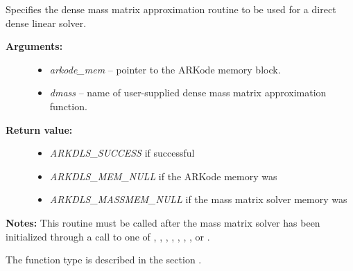 \documentclass[letterpaper,10pt,english]{sphinxmanual}
\begin{document}
\begin{fulllineitems}
\label{c_interface/User_callable:c.ARKDlsSetDenseMassFn}
Specifies the dense mass matrix approximation routine to
be used for a direct dense linear solver.
\begin{description}
\item[{\textbf{Arguments:}}] \leavevmode\begin{itemize}
\item {} 
\emph{arkode\_mem} -- pointer to the ARKode memory block.

\item {} 
\emph{dmass} -- name of user-supplied dense mass matrix approximation function.

\end{itemize}

\item[{\textbf{Return value:}}] \leavevmode\begin{itemize}
\item {} 
\emph{ARKDLS\_SUCCESS}  if successful

\item {} 
\emph{ARKDLS\_MEM\_NULL}  if the ARKode memory was 

\item {} 
\emph{ARKDLS\_MASSMEM\_NULL} if the mass matrix solver memory was 

\end{itemize}

\end{description}

\textbf{Notes:} This routine must be called after the mass matrix solver
has been initialized through a call to one of
{\hyperref[c_interface/User_callable:c.ARKMassDense]{\emph{}}}, {\hyperref[c_interface/User_callable:c.ARKMassLapackDense]{\emph{}}},
{\hyperref[c_interface/User_callable:c.ARKMassBand]{\emph{}}}, {\hyperref[c_interface/User_callable:c.ARKMassLapackBand]{\emph{}}},
{\hyperref[c_interface/User_callable:c.ARKMassSpgmr]{\emph{}}}, {\hyperref[c_interface/User_callable:c.ARKMassSpbcg]{\emph{}}},
{\hyperref[c_interface/User_callable:c.ARKMassSptfqmr]{\emph{}}}, {\hyperref[c_interface/User_callable:c.ARKMassSpfgmr]{\emph{}}} or
{\hyperref[c_interface/User_callable:c.ARKMassPcg]{\emph{}}}.

The function type {\hyperref[c_interface/User_supplied:c.ARKDlsDenseMassFn]{\emph{}}} is described in the section
{\hyperref[c_interface/User_supplied:cinterface-usersupplied]{\emph{}}}.

\end{fulllineitems}
\end{document}
